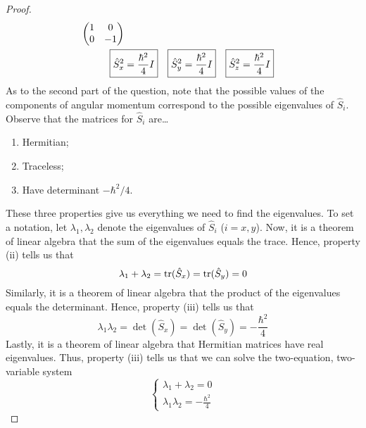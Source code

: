 \documentclass[../psets.tex]{subfiles}
\begin{document}
\begin{enumerate}
\begin{enumerate}
\begin{proof}
\begin{align*}
                        \begin{pmatrix}
                            1 & 0\\
                            0 & -1\\
                        \end{pmatrix}\\
                \Aboxed{\hat{S}_x^2 &= \frac{\hbar^2}{4}I}&
                    \Aboxed{\hat{S}_y^2 &= \frac{\hbar^2}{4}I}&
                        \Aboxed{\hat{S}_z^2 &= \frac{\hbar^2}{4}I}
            \end{align*}
            As to the second part of the question, note that the possible values of the components of angular momentum correspond to the possible eigenvalues of $\hat{S}_i$. Observe that the matrices for $\hat{S}_i$ are\dots
            \begin{enumerate}
                \item Hermitian;
                \item Traceless;
                \item Have determinant $-\hbar^2/4$.
            \end{enumerate}
            These three properties give us everything we need to find the eigenvalues. To set a notation, let $\lambda_1,\lambda_2$ denote the eigenvalues of $\hat{S}_i$ ($i=x,y$). Now, it is a theorem of linear algebra that the sum of the eigenvalues equals the trace. Hence, property (ii) tells us that
            \begin{equation*}
                \lambda_1+\lambda_2 = {\tr}(\hat{S}_x)
                = {\tr}(\hat{S}_y)
                = 0
            \end{equation*}
            Similarly, it is a theorem of linear algebra that the product of the eigenvalues equals the determinant. Hence, property (iii) tells us that
            \begin{equation*}
                \lambda_1\lambda_2 = {\det}(\hat{S}_x)
                = {\det}(\hat{S}_y)
                = -\frac{\hbar^2}{4}
            \end{equation*}
            Lastly, it is a theorem of linear algebra that Hermitian matrices have real eigenvalues. Thus, property (iii) tells us that we can solve the two-equation, two-variable system
            \begin{equation*}
                \begin{cases}
                    \lambda_1+\lambda_2 = 0\\
                    \lambda_1\lambda_2 = -\frac{\hbar^2}{4}

\end{cases}
\end{equation*}
\end{proof}
\end{enumerate}
\end{enumerate}
\end{document}

